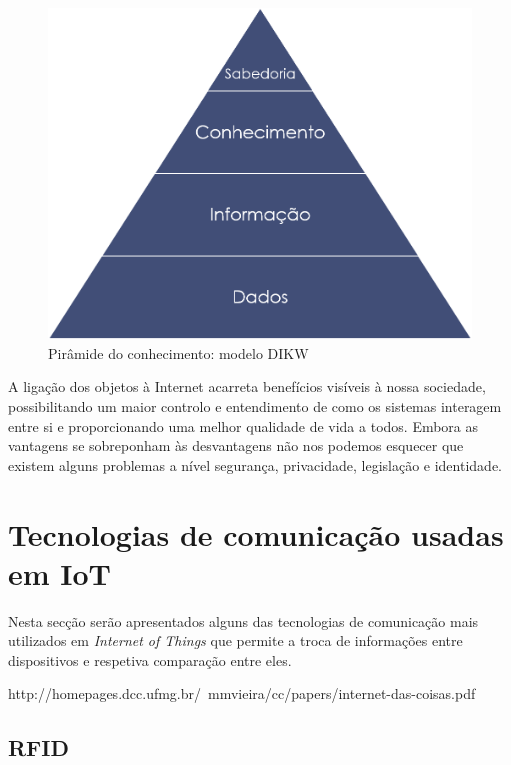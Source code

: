 \begin{figure}[!htb]
	\centering
	\includegraphics[scale=0.3]{img/cap3-iot/dikw.png}
	\caption{Pirâmide do conhecimento: modelo DIKW}
	\label{dikw}
\end{figure}



A ligação dos objetos à Internet acarreta benefícios visíveis à nossa sociedade, possibilitando um maior controlo e entendimento de como os sistemas interagem entre si e proporcionando uma melhor qualidade de vida a todos. Embora as vantagens se sobreponham às desvantagens não nos podemos esquecer que existem alguns problemas a nível segurança, privacidade, legislação e identidade.


\section{Tecnologias de comunicação usadas em \ac{IoT}}

Nesta secção serão apresentados alguns das tecnologias de comunicação mais utilizados em \textit{Internet of Things} que permite a troca de informações entre dispositivos e respetiva comparação entre eles. 
 
 
 http://homepages.dcc.ufmg.br/~mmvieira/cc/papers/internet-das-coisas.pdf\\
 
\subsection{RFID}


